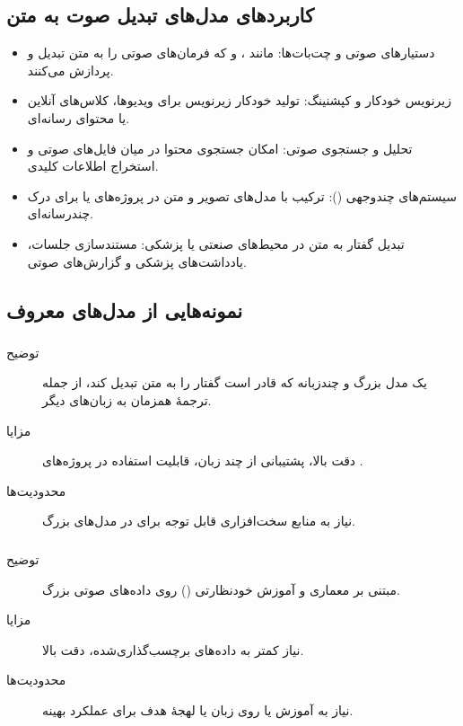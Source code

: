 \documentclass{article}
\begin{document}
\subsection{کاربردهای مدل‌های تبدیل صوت به متن}
\begin{itemize}
\item دستیارهای صوتی و چت‌بات‌ها: مانند ،  و  که فرمان‌های صوتی را به متن تبدیل و پردازش می‌کنند.

\item زیرنویس خودکار و کپشنینگ: تولید خودکار زیرنویس برای ویدیوها، کلاس‌های آنلاین یا محتوای رسانه‌ای.

\item تحلیل و جستجوی صوتی: امکان جستجوی محتوا در میان فایل‌های صوتی و استخراج اطلاعات کلیدی.

\item سیستم‌های چندوجهی (): ترکیب با مدل‌های تصویر و متن در پروژه‌های  یا  برای درک چندرسانه‌ای.

\item تبدیل گفتار به متن در محیط‌های صنعتی یا پزشکی: مستندسازی جلسات، یادداشت‌های پزشکی و گزارش‌های صوتی.

\end{itemize}

\subsection{نمونه‌هایی از مدل‌های معروف}

\subsubsection{}
\begin{description}
\item[توضیح] یک مدل بزرگ و چندزبانه که قادر است گفتار را به متن تبدیل کند، از جمله ترجمهٔ همزمان به زبان‌های دیگر.

\item[مزایا] دقت بالا، پشتیبانی از چند زبان، قابلیت استفاده در پروژه‌های .

\item[محدودیت‌ها] نیاز به منابع سخت‌افزاری قابل توجه برای  در مدل‌های بزرگ.

\end{description}

\subsubsection{}
\begin{description}
\item[توضیح] مبتنی بر معماری  و آموزش خودنظارتی () روی داده‌های صوتی بزرگ.

\item[مزایا] نیاز کمتر به داده‌های برچسب‌گذاری‌شده، دقت بالا.
\item[محدودیت‌ها] نیاز به آموزش یا  روی زبان یا لهجهٔ هدف برای عملکرد بهینه.

\end{description}
\end{document}
